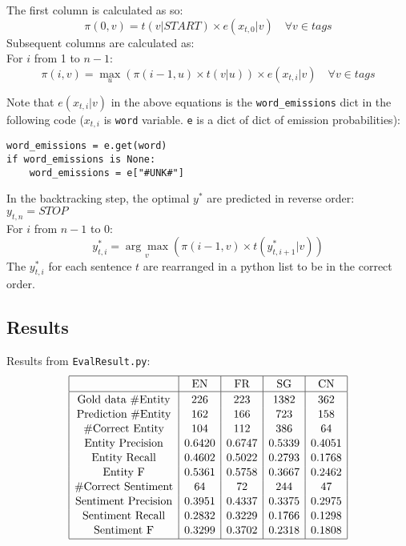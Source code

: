 \documentclass[12pt]{article}
\begin{document}
The first column is calculated as so:
\[ \pi(0,v) = t(v|START) \times e(x_{t,0}|v) \quad \forall v \in {tags}\]
Subsequent columns are calculated as:\\
For \(i\) from 1 to \(n-1\):
\[ \pi(i,v) = \max_u \left( \pi(i-1,u) \times t(v|u) \right) \times e(x_{t,i}|v) \quad \forall v \in {tags}\]

Note that \(e(x_{t,i}|v)\) in the above equations is the \verb|word_emissions| dict in the following code (\(x_{t,i}\) is \verb|word| variable. \verb|e| is a dict of dict of emission probabilities):
\begin{verbatim}
word_emissions = e.get(word)
if word_emissions is None:
    word_emissions = e["#UNK#"]
\end{verbatim}

In the backtracking step, the optimal \(y^*\) are predicted in reverse order:\\
\(y_{t,n} = STOP\) \\
For \(i\) from \(n-1\) to 0:
\[y_{t,i}^* = \underset{v}{\arg\max} \left( \pi(i-1,v) \times t(y_{t,i+1}^*|v) \right)\]
The \(y_{t,i}^*\) for each sentence \(t\) are rearranged in a python list to be in the correct order.

\subsection{Results}
Results from \verb|EvalResult.py|:
\[
\begin{array}{|c|c|c|c|c|}
\hline \rule{0pt}{1em}
& \mbox{EN} & \mbox{FR} & \mbox{SG} & \mbox{CN} \\
\hline \rule{0pt}{1em}
\mbox{Gold data \#Entity} & 226    & 223    & 1382   & 362    \\[0.1em]
\mbox{Prediction \#Entity}& 162    & 166    & 723    & 158    \\[0.1em]
\mbox{\#Correct Entity}   & 104    & 112    & 386    & 64     \\[0.1em]
\mbox{Entity Precision}   & 0.6420 & 0.6747 & 0.5339 & 0.4051 \\[0.1em]
\mbox{Entity Recall}      & 0.4602 & 0.5022 & 0.2793 & 0.1768 \\[0.1em]
\mbox{Entity F}           & 0.5361 & 0.5758 & 0.3667 & 0.2462 \\[0.1em]
\mbox{\#Correct Sentiment}& 64     & 72     & 244    & 47     \\[0.1em]
\mbox{Sentiment Precision}& 0.3951 & 0.4337 & 0.3375 & 0.2975 \\[0.1em]
\mbox{Sentiment Recall}   & 0.2832 & 0.3229 & 0.1766 & 0.1298 \\[0.1em]
\mbox{Sentiment F}        & 0.3299 & 0.3702 & 0.2318 & 0.1808 \\[0.1em] 
\hline
\end{array}
\]
\end{document}
